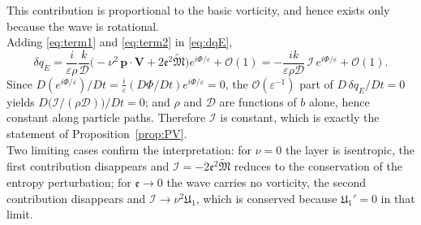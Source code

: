 \documentclass[reqno]{amsart}
\newcommand{\B}{{\mathfrak{M}}}
\newcommand{\D}{\mathcal{D}}
\newcommand{\ee}{\mathfrak{e}}
\newcommand{\e}{{\varepsilon}}
\begin{document}
This contribution is proportional to the basic vorticity, and hence exists only because the wave is rotational.\\
\noindent
Adding \eqref{eq:term1} and \eqref{eq:term2} in \eqref{eq:dqE},
\begin{equation}
\delta q_E=\frac{i}{\e\rho}\frac{k}{\D}\Big(-\nu^{2}\,\mathbf p\cdot\mathbf V+2\ee^{2}\widetilde{\B}\Big)e^{i\Phi/\e}+\mathcal{O}(1)
=-\frac{ik}{\e\rho\D}\,\mathcal I\,e^{i\Phi/\e}+\mathcal{O}(1).
\end{equation}
Since $D(e^{i\Phi/\e})/Dt=\frac{i}{\e}({D\Phi}/{Dt})e^{i\Phi/\e}=0$, the $\mathcal{O}(\e^{-1})$ part of $D\,\delta q_E/Dt=0$ yields $D\big(\mathcal I/(\rho\D)\big)/Dt=0$; and $\rho$ and $\D$ are functions of $b$ alone, hence constant along particle paths. Therefore $\mathcal I$ is constant, which is exactly the statement of Proposition~\ref{prop:PV}.\\
Two limiting cases confirm the interpretation: for $\nu=0$ the layer is isentropic, the first contribution disappears and $\mathcal I=-2\ee^{2}\widetilde{\B}$ reduces to the conservation of the entropy perturbation; for $\ee\to0$ the wave carries no vorticity, the second contribution disappears and $\mathcal I\to\nu^{2}\mathfrak{U}_1$, which is conserved because $\mathfrak{U}_1'=0$ in that limit.
\end{document}
